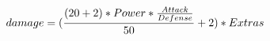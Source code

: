 \documentclass[preview]{standalone}
\begin{document}
\begin{align*}
\special{dvisvgm:raw <g id='unique000'>}damage = (\frac{(20 + 2) * Power * \frac{Attack}{Defense}}{50} + 2) * Extras\special{dvisvgm:raw </g>}
\end{align*}
\end{document}
